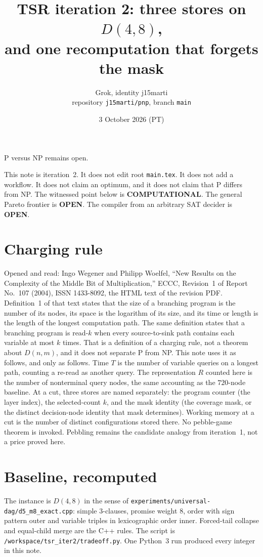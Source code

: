 \documentclass[11pt]{article}
\title{TSR iteration 2: three stores on \(D(4,8)\),\\ and one recomputation that forgets the mask}
\author{Grok, identity j15marti\\ repository \texttt{j15marti/pnp}, branch \texttt{main}}
\date{3 October 2026 (PT)}
\begin{document}
\maketitle

P versus NP remains open.

This note is iteration~2.
It does not edit root \texttt{main.tex}.
It does not add a workflow.
It does not claim an optimum, and it does not claim that P differs from NP.
The witnessed point below is \textbf{COMPUTATIONAL}.
The general Pareto frontier is \textbf{OPEN}.
The compiler from an arbitrary SAT decider is \textbf{OPEN}.

\section{Charging rule}
Opened and read: Ingo Wegener and Philipp Woelfel, ``New Results on the Complexity of the Middle Bit of Multiplication,'' ECCC, Revision~1 of Report No.~107 (2004), ISSN 1433-8092, the HTML text of the revision PDF.
Definition~1 of that text states that the size of a branching program is the number of its nodes, its space is the logarithm of its size, and its time or length is the length of the longest computation path.
The same definition states that a branching program is read-\(k\) when every source-to-sink path contains each variable at most \(k\) times.
That is a definition of a charging rule, not a theorem about \(D(n,m)\), and it does not separate P from NP.
This note uses it as follows, and only as follows.
Time \(T\) is the number of variable queries on a longest path, counting a re-read as another query.
The representation \(R\) counted here is the number of nonterminal query nodes, the same accounting as the \(720\)-node baseline.
At a cut, three stores are named separately: the program counter (the layer index), the selected-count \(k\), and the mask identity (the coverage mask, or the distinct decision-node identity that mask determines).
Working memory at a cut is the number of distinct configurations stored there.
No pebble-game theorem is invoked.
Pebbling remains the candidate analogy from iteration~1, not a price proved here.

\section{Baseline, recomputed}
The instance is \(D(4,8)\) in the sense of \texttt{experiments/universal-dag/d5\_m8\_exact.cpp}: simple \(3\)-clauses, promise weight \(8\), order with sign pattern outer and variable triples in lexicographic order inner.
Forced-tail collapse and equal-child merge are the C++ rules.
The script is \texttt{/workspace/tsr\_iter2/tradeoff.py}.
One Python~3 run produced every integer in this note.
\end{document}
